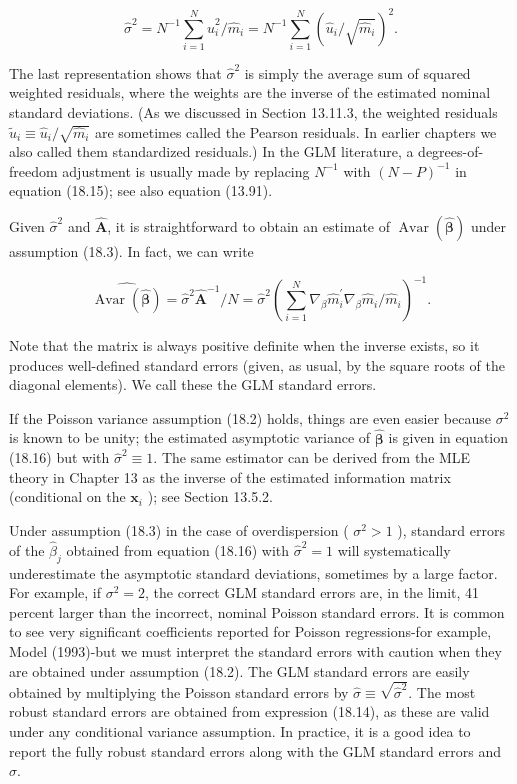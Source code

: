 \documentclass[10pt]{article}
\begin{document}
\begin{equation*}
\hat{\sigma}^{2}=N^{-1} \sum_{i=1}^{N} \hat{u}_{i}^{2} / \hat{m}_{i}=N^{-1} \sum_{i=1}^{N}\left(\hat{u}_{i} / \sqrt{\hat{m}_{i}}\right)^{2} . \tag{18.15}
\end{equation*}


The last representation shows that $\hat{\sigma}^{2}$ is simply the average sum of squared weighted residuals, where the weights are the inverse of the estimated nominal standard deviations. (As we discussed in Section 13.11.3, the weighted residuals $\tilde{u}_{i} \equiv \hat{u}_{i} / \sqrt{\hat{m}_{i}}$ are sometimes called the Pearson residuals. In earlier chapters we also called them standardized residuals.) In the GLM literature, a degrees-of-freedom adjustment is usually made by replacing $N^{-1}$ with $(N-P)^{-1}$ in equation (18.15); see also equation (13.91).

Given $\hat{\sigma}^{2}$ and $\hat{\mathbf{A}}$, it is straightforward to obtain an estimate of $\operatorname{Avar}(\hat{\boldsymbol{\beta}})$ under assumption (18.3). In fact, we can write


\begin{equation*}
\widehat{\operatorname{Avar}(\hat{\boldsymbol{\beta}})}=\hat{\sigma}^{2} \hat{\mathbf{A}}^{-1} / N=\hat{\sigma}^{2}\left(\sum_{i=1}^{N} \nabla_{\beta} \hat{m}_{i}^{\prime} \nabla_{\beta} \hat{m}_{i} / \hat{m}_{i}\right)^{-1} . \tag{18.16}
\end{equation*}


Note that the matrix is always positive definite when the inverse exists, so it produces well-defined standard errors (given, as usual, by the square roots of the diagonal elements). We call these the GLM standard errors.

If the Poisson variance assumption (18.2) holds, things are even easier because $\sigma^{2}$ is known to be unity; the estimated asymptotic variance of $\hat{\boldsymbol{\beta}}$ is given in equation (18.16) but with $\hat{\sigma}^{2} \equiv 1$. The same estimator can be derived from the MLE theory in Chapter 13 as the inverse of the estimated information matrix (conditional on the $\mathbf{x}_{i}$ ); see Section 13.5.2.

Under assumption (18.3) in the case of overdispersion ( $\sigma^{2}>1$ ), standard errors of the $\hat{\beta}_{j}$ obtained from equation (18.16) with $\hat{\sigma}^{2}=1$ will systematically underestimate the asymptotic standard deviations, sometimes by a large factor. For example, if $\sigma^{2}=2$, the correct GLM standard errors are, in the limit, 41 percent larger than the incorrect, nominal Poisson standard errors. It is common to see very significant coefficients reported for Poisson regressions-for example, Model (1993)-but we must interpret the standard errors with caution when they are obtained under assumption (18.2). The GLM standard errors are easily obtained by multiplying the Poisson standard errors by $\hat{\sigma} \equiv \sqrt{\hat{\sigma}^{2}}$. The most robust standard errors are obtained from expression (18.14), as these are valid under any conditional variance assumption. In practice, it is a good idea to report the fully robust standard errors along with the GLM standard errors and $\hat{\sigma}$.
\end{document}
